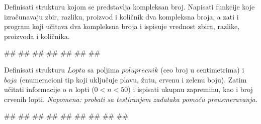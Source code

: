 \begin{Exercise}[label=p2.5_01] 
Definisati strukturu kojom se predstavlja kompleksan broj. Napisati funkcije koje izračunavaju zbir, razliku, proizvod i količnik dva kompleksna broja, a zati i program koji učitava dva kompleksna broja i ispisuje vrednost zbira, razlike, proizvoda i količnika. \\
\begin{maxitest}
\begin{upotreba}{1}
#\naslovInt#
##
##
##
##
##
##
\end{upotreba}
\end{maxitest}
\end{Exercise}
\begin{Answer}[ref=p2.5_01]
\end{Answer}

\begin{Exercise}[label=p2.5_02] 
Definisati strukturu $Lopta$ sa poljima $poluprecnik$ (ceo broj u centimetrima) i $boja$ (enumeracioni tip koji uključuje plavu, žutu, crvenu i zelenu boju). Zatim učitati informacije o $n$ lopti ($0<n<50$) i ispisati ukupnu zapreminu, kao i broj crvenih lopti. \textit{Napomena: probati sa testiranjem zadataka pomoću preusmeravanja.}\\
\begin{maxitest}
\begin{upotreba}{1}
#\naslovInt#
##
##
##
##
##
##
##
##
\end{upotreba}
\end{maxitest}

\end{Exercise}
\begin{Answer}[ref=p2.5_02]
\end{Answer}

